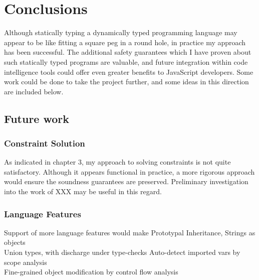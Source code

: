 \documentclass[12pt,a4paper,twoside,openright]{report}
\theoremstyle{definition}
\theoremstyle{dotless}
\begin{document}
\chapter{Conclusions}

Although statically typing a dynamically typed programming language may appear to be like
fitting a square peg in a round hole, in practice my approach has been successful. The 
additional safety guarantees which I have proven about such statically typed programs
are valuable, and future integration within code intelligence tools could offer even 
greater benefits to JavaScript developers. Some work could be done to take the project 
further, and some ideas in this direction are included below.

\section{Future work}

\subsection{Constraint Solution}
As indicated in chapter 3, my approach to solving constraints is not quite satisfactory. 
Although it appears functional in practice, a more rigorous approach would ensure the
soundness guarantees are preserved. Preliminary investigation into the work of
XXX\cite{something} may be useful in this regard.

\subsection{Language Features}
Support of more language features would make 
Prototypal Inheritance, Strings as
objects \\ Union types, with discharge under type-checks Auto-detect imported
vars by scope analysis \\ Fine-grained object modification by control flow
analysis

\printbibliography{}
\end{document}
